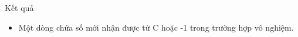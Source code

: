 Kết quả
\begin{itemize}
	\item Một dòng chứa số mới nhận được từ C hoặc -1 trong trường hợp vô nghiệm.
\end{itemize}